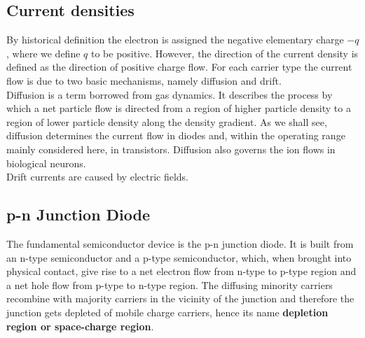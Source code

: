 \documentclass[main]{subfiles}
\begin{document}
\subsection{Current densities}
By historical definition the electron is assigned the negative elementary charge \(-q\) , where we define \(q\) to be positive. However, the direction of the current density is
defined as the direction of positive charge flow. For each carrier type the current flow is due to two basic mechanisms, namely diffusion and drift.\\
Diffusion is a term borrowed from gas dynamics. It describes the process by which a net particle flow is directed from a region of
higher particle density to a region of lower particle density along the density gradient. As we shall see, diffusion determines the current flow in diodes and, within the operating range mainly considered here, in transistors.
Diffusion also governs the ion flows in biological neurons.\\
Drift currents are caused by electric fields.

\subsection{p-n Junction Diode}
The fundamental semiconductor device is the p-n junction diode. It is built from an n-type semiconductor and a p-type semiconductor, which, when brought into physical contact, give rise to a net electron flow from n-type to p-type region and a net hole flow from p-type to n-type region. The diffusing minority carriers recombine with majority carriers in the vicinity of the junction and therefore the junction gets depleted of mobile charge carriers, hence its name \textbf{depletion region or space-charge region}. 
\end{document}
